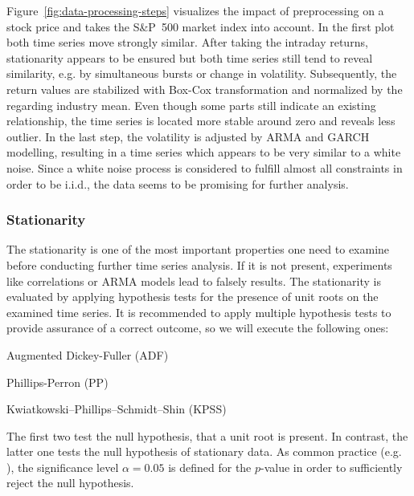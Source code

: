 Figure~\ref{fig:data-processing-steps} visualizes the impact of preprocessing on a stock price and takes the S\&P~500 market index into account. In the first plot both time series move strongly similar. After taking the intraday returns, stationarity appears to be ensured but both time series still tend to reveal similarity, e.g. by simultaneous bursts or change in volatility. Subsequently, the return values are stabilized with Box-Cox transformation and normalized by the regarding industry mean. Even though some parts still indicate an existing relationship, the time series is located more stable around zero and reveals less outlier. In the last step, the volatility is adjusted by ARMA and GARCH modelling, resulting in a time series which appears to be very similar to a white noise. Since a white noise process is considered to fulfill almost all constraints in order to be i.i.d., the data seems to be promising for further analysis.


\subsubsection{Stationarity}
\label{subsubsection:stationarity}

The stationarity is one of the most important properties one need to examine before conducting further time series analysis. If it is not present, experiments like correlations or ARMA models lead to falsely results. The stationarity is evaluated by applying hypothesis tests for the presence of unit roots on the examined time series. It is recommended to apply multiple hypothesis tests to provide assurance of a correct outcome, so we will execute the following ones:
\begin{enumerate*}[label=(\roman*)]
    \item Augmented Dickey-Fuller (ADF) \cite{Dickey1976IntroductionSeries}
    \item Phillips-Perron (PP) \cite{Phillips1988TestingRegression}
    \item Kwiatkowski–Phillips–Schmidt–Shin (KPSS) \cite{Kwiatkowski1992TestingRoot}
\end{enumerate*}

The first two test the null hypothesis, that a unit root is present. In contrast, the latter one tests the null hypothesis of stationary data. As common practice (e.g. \cite{Bishara2012TestingApproaches}), the significance level $\alpha=0.05$ is defined for the $p$-value in order to sufficiently reject the null hypothesis.


